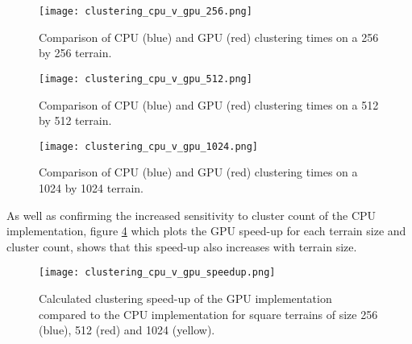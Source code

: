 \begin{figure}
\center
	\texttt{[image: clustering\_cpu\_v\_gpu\_256.png]}
	\caption{ Comparison of CPU (blue) and GPU (red) clustering times on a 256 by 256 terrain.}	
	\label{fig:clustering_cpu_v_gpu_256}
\end{figure}

\begin{figure}
\center
	\texttt{[image: clustering\_cpu\_v\_gpu\_512.png]}
	\caption{ Comparison of CPU (blue) and GPU (red) clustering times on a 512 by 512 terrain.}	
	\label{fig:clustering_cpu_v_gpu_512}
\end{figure}

\begin{figure}
\center
	\texttt{[image: clustering\_cpu\_v\_gpu\_1024.png]}
	\caption{ Comparison of CPU (blue) and GPU (red) clustering times on a 1024 by 1024 terrain.}	
	\label{fig:clustering_cpu_v_gpu_1024}
\end{figure}

As well as confirming the increased sensitivity to cluster count of the CPU implementation, figure \ref{fig:clustering_cpu_v_gpu_speedup} which plots the GPU speed-up for each terrain size and cluster count, shows that this speed-up also increases with terrain size. 

\begin{figure}
\center
	\texttt{[image: clustering\_cpu\_v\_gpu\_speedup.png]}
	\caption{ Calculated clustering speed-up of the GPU implementation compared to the CPU implementation for square terrains of size 256 (blue), 512 (red) and 1024 (yellow).}	
	\label{fig:clustering_cpu_v_gpu_speedup}
\end{figure}